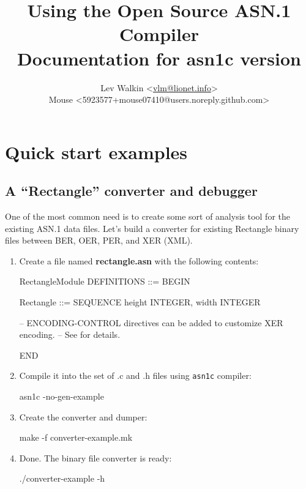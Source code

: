 \documentclass[english,oneside,12pt]{book}
\newcommand{\cmd}[1]{\texttt{#1}}
\begin{document}
\title{Using the Open Source ASN.1 Compiler\\
\vspace*{0.4cm}
\Large Documentation for asn1c version \asnver{}}
\author{Lev Walkin <\href{mailto:vlm@lionet.info?Subject=asn1c}
{vlm@lionet.info}>\\ 
Mouse <5923577+mouse07410@users.noreply.github.com>}

\pagestyle{fancy}
\fancyhead[L]{\leftmark}
\maketitle

\tableofcontents{}

\chapter{\label{chap:Quick-start-examples}Quick start examples}

\section{A “Rectangle” converter and debugger}

One of the most common need is to create some sort of analysis tool
for the existing ASN.1 data files. Let's build a converter for existing
Rectangle binary files between BER, OER, PER, and XER (XML).

\begin{enumerate}
\item Create a file named \textbf{rectangle.asn} with the following contents:
\begin{asn}
RectangleModule DEFINITIONS ::= BEGIN

Rectangle ::= SEQUENCE {
    height  INTEGER,
    width   INTEGER
}

-- ENCODING-CONTROL directives can be added to customize XER encoding.
-- See  for details.

END
\end{asn}

\item Compile it into the set of .c and .h files using \cmd{asn1c} compiler:

\begin{bash}
asn1c -no-gen-example %
\end{bash}

\item Create the converter and dumper:

\begin{bash}
make -f converter-example.mk
\end{bash}

\item Done. The binary file converter is ready:

\begin{bash}
./converter-example -h
\end{bash}
\end{enumerate}
\end{document}
